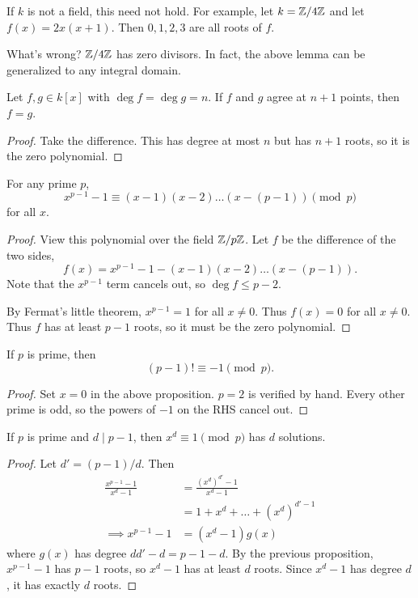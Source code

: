 \begin{remark}
    If $k$ is not a field, this need not hold.
    For example, let $k = \mathbb{Z}/4\mathbb{Z}$ and let $f(x) = 2x(x+1)$.
    Then $0, 1, 2, 3$ are all roots of $f$.

    What's wrong? $\mathbb{Z}/4\mathbb{Z}$ has zero divisors.
    In fact, the above lemma can be generalized to any integral domain.
\end{remark}

\begin{corollary}
    Let $f, g \in k[x]$ with $\deg f = \deg g = n$.
    If $f$ and $g$ agree at $n + 1$ points, then $f = g$.
\end{corollary}
\begin{proof}
    Take the difference.
    This has degree at most $n$ but has $n + 1$ roots,
    so it is the zero polynomial.
\end{proof}

\begin{proposition}
    For any prime $p$, \[
        x^{p-1} - 1 \equiv (x - 1)(x - 2) \dots (x - (p-1)) \pmod{p}
    \] for all $x$.
\end{proposition}
\begin{proof}
    View this polynomial over the field $\mathbb{Z}/p\mathbb{Z}$.
    Let $f$ be the difference of the two sides, \[
        f(x) = x^{p-1} - 1 - (x - 1)(x - 2) \dots (x - (p-1)).
    \] Note that the $x^{p-1}$ term cancels out, so $\deg f \le p - 2$.

    By Fermat's little theorem, $x^{p-1} = 1$ for all $x \ne 0$.
    Thus $f(x) = 0$ for all $x \ne 0$.
    Thus $f$ has at least $p - 1$ roots, so it must be the zero polynomial.
\end{proof}

\begin{corollary} \label{thm:wilson}
    If $p$ is prime, then \[
        (p-1)! \equiv -1 \pmod{p}.
    \]
\end{corollary}
\begin{proof}
    Set $x = 0$ in the above proposition.
    $p = 2$ is verified by hand.
    Every other prime is odd, so the powers of $-1$ on the RHS cancel out.
\end{proof}

\begin{proposition} \label{thm:x^d-1}
    If $p$ is prime and $d \mid p - 1$, then $x^d \equiv 1 \pmod p$
    has $d$ solutions.
\end{proposition}
\begin{proof}
    Let $d' = (p - 1)/d$.
    Then \begin{align*}
        \frac{x^{p-1} - 1}{x^d - 1}
        &= \frac{(x^d)^{d'} - 1}{x^d - 1} \\
        &= 1 + x^d + \dots + (x^d)^{d' - 1} \\
        \implies x^{p-1} - 1 &= (x^d - 1) g(x)
    \end{align*} where $g(x)$ has degree $dd' - d = p - 1 - d$.
    By the previous proposition, $x^{p-1} - 1$ has $p - 1$ roots,
    so $x^d - 1$ has at least $d$ roots.
    Since $x^d - 1$ has degree $d$, it has exactly $d$ roots.
\end{proof}


